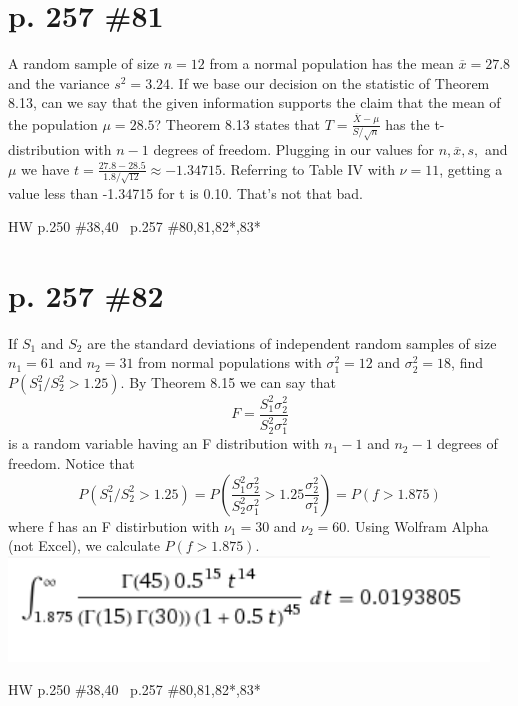 \documentclass[12pt]{article}
\begin{document}
	\section[20pt]{p. 257 \#81}
	A random sample of size \(n=12\) from a normal population has the mean \(\overline{x}=27.8\) and the variance \(s^2=3.24\). If we base our decision on the statistic of Theorem 8.13, can we say that the given information supports the claim that the mean of the population \(\mu = 28.5\)? \newline \newline
	Theorem 8.13 states that \(T=\frac{\overline{X}-\mu}{S/\sqrt{n}}\) has the t-distribution with \(n-1\) degrees of freedom. \newline
	Plugging in our values for \(n,\overline{x},s,\) and \(\mu\) we have
	\(t=\frac{27.8-28.5}{1.8/\sqrt{12}}\approx -1.34715\). \newline
	\newline
	Referring to Table IV with \(\nu = 11\), getting a value less than -1.34715 for t is 0.10. That's not that bad. \newline
	\newline \newpage
	\maketitle HW p.250 \#38,40 \ p.257 \#80,81,82*,83*
	\section[20pt]{p. 257 \#82}
	If \(S_1\) and \(S_2\) are the standard deviations of independent random samples of size \(n_1=61\) and \(n_2=31\) from normal populations with \(\sigma_1^2=12\) and \(\sigma_2^2=18\), find \(P(S_1^2/S_2^2>1.25)\). \newline \newline
	By Theorem 8.15 we can say that
	\[F=\frac{S_1^2\sigma_2^2}{S_2^2\sigma_1^2}\]
	is a random variable having an F distribution with \(n_1-1\) and \(n_2-1\) degrees of freedom. \newline
	Notice that
	\[P(S_1^2/S_2^2>1.25) = P(\frac{S_1^2\sigma_2^2}{S_2^2\sigma_1^2}>1.25\frac{\sigma_2^2}{\sigma_1^2})=P(f > 1.875)\]
	where f has an F distirbution with \(\nu_1=30\) and \(\nu_2=60\).
	Using Wolfram Alpha (not Excel), we calculate \(P(f > 1.875)\).
	\newline \newline
	\includegraphics{spicy integral}
	\newline
	\newline \newpage
	\maketitle HW p.250 \#38,40 \ p.257 \#80,81,82*,83*
\end{document}
